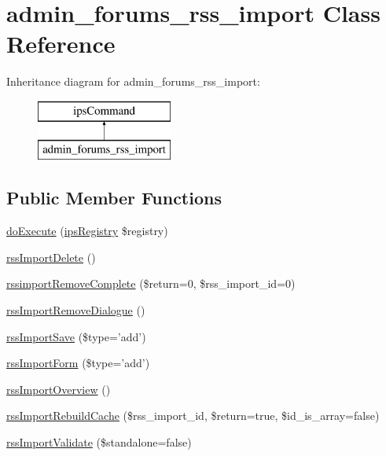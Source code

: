\hypertarget{classadmin__forums__rss__import}{\section{admin\-\_\-forums\-\_\-rss\-\_\-import Class Reference}
\label{classadmin__forums__rss__import}
}
Inheritance diagram for admin\-\_\-forums\-\_\-rss\-\_\-import\-:\begin{figure}[H]
\begin{center}
\leavevmode
\includegraphics[height=2.000000cm]{classadmin__forums__rss__import}
\end{center}
\end{figure}
\subsection*{Public Member Functions}
\begin{DoxyCompactItemize}
\item 
\hyperlink{classadmin__forums__rss__import_afbc4e912a0604b94d47d66744c64d8ba}{do\-Execute} (\hyperlink{classips_registry}{ips\-Registry} \$registry)
\item 
\hyperlink{classadmin__forums__rss__import_a7a000dd3a0a2bf325d783268f1f647da}{rss\-Import\-Delete} ()
\item 
\hyperlink{classadmin__forums__rss__import_a64f1c24c7fb40f9a28f65dc9ff0aad41}{rssimport\-Remove\-Complete} (\$return=0, \$rss\-\_\-import\-\_\-id=0)
\item 
\hyperlink{classadmin__forums__rss__import_a7d3fc208181ea92e05c062c4456661d8}{rss\-Import\-Remove\-Dialogue} ()
\item 
\hyperlink{classadmin__forums__rss__import_a231039982cc7c8a590d2ee9b62e0ac3f}{rss\-Import\-Save} (\$type='add')
\item 
\hyperlink{classadmin__forums__rss__import_a7092081a07ea99e25a27872804bf6927}{rss\-Import\-Form} (\$type='add')
\item 
\hyperlink{classadmin__forums__rss__import_a2c732179c46a71b4b1854182e4e18d1c}{rss\-Import\-Overview} ()
\item 
\hyperlink{classadmin__forums__rss__import_a2cfcb09059a5062a962826e01f3d8ec8}{rss\-Import\-Rebuild\-Cache} (\$rss\-\_\-import\-\_\-id, \$return=true, \$id\-\_\-is\-\_\-array=false)
\item 
\hyperlink{classadmin__forums__rss__import_a8a63ce71389137f3efd49dea66231c21}{rss\-Import\-Validate} (\$standalone=false)
\end{DoxyCompactItemize}
